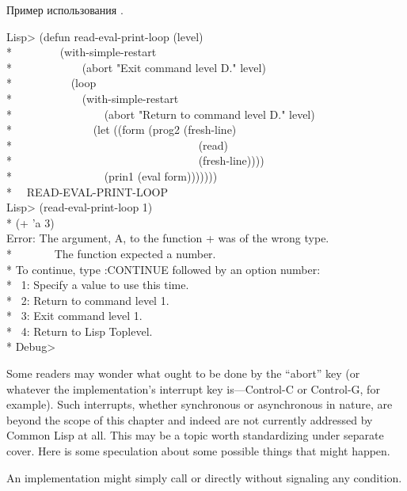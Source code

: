 \begin{defmac}
Пример использования .
\begin{lisp}
Lisp> (defun read-eval-print-loop (level) \\*
~~~~~~~~(with-simple-restart \\*
~~~~~~~~~~~~(abort "Exit command level {\Xtilde}D." level) \\*
~~~~~~~~~~(loop \\*
~~~~~~~~~~~~(with-simple-restart \\*
~~~~~~~~~~~~~~~~(abort "Return to command level {\Xtilde}D." level) \\*
~~~~~~~~~~~~~~(let ((form (prog2 (fresh-line) \\*
~~~~~~~~~~~~~~~~~~~~~~~~~~~~~~~~~(read) \\*
~~~~~~~~~~~~~~~~~~~~~~~~~~~~~~~~~(fresh-line)))) \\*
~~~~~~~~~~~~~~~~(prin1 (eval form))))))) \\*
~\EV\ READ-EVAL-PRINT-LOOP \\
Lisp> (read-eval-print-loop 1) \\*
(+ 'a 3) \\
Error: The argument, A, to the function + was of the wrong type. \\*
~~~~~~~The function expected a number. \\*
To continue, type :CONTINUE followed by an option number: \\*
~1: Specify a value to use this time. \\*
~2: Return to command level 1. \\*
~3: Exit command level 1. \\*
~4: Return to Lisp Toplevel. \\*
Debug> 
\end{lisp}

\beforenoterule
\begin{sideremark}
Some readers may wonder what ought to be done by the ``abort'' key (or whatever
the implementation's interrupt key is---Control-C or Control-G, for
example). Such interrupts, whether synchronous or asynchronous in nature, are
beyond the scope of this chapter and indeed are not currently addressed by
Common Lisp at all. This may be a topic worth standardizing under separate
cover. Here is some speculation about some possible things that might happen.

An implementation might simply call  or  directly without
signaling any condition.


\end{sideremark}
\end{defmac}
